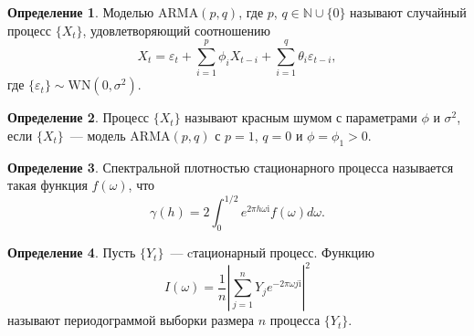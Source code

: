 \documentclass[specialist,
substylefile = spbu_report.rtx,
subf,href,colorlinks=true, 12pt]{disser}
\theoremstyle{definition}
\newtheorem{definition}{Определение}[section]
\newcommand{\im}{\mathrm{i}}
\begin{document}
\begin{definition}
	Моделью $\mathrm{ARMA}(p, q)$, где $p$, $q\in \mathbb{N}\cup\{0\}$ называют случайный процесс $\{X_t\}$, удовлетворяющий соотношению
	\[
		X_t=\varepsilon_t + \sum_{i=1}^p \phi_i X_{t-i} + \sum_{i=1}^q\theta_i\varepsilon_{t-i},
	\]
	где $\{\varepsilon_t\}\sim\mathrm{WN}(0, \sigma^2)$.
\end{definition}

\begin{definition}
	Процесс $\{X_t\}$ называют красным шумом с параметрами $\phi$ и $\sigma^2$, если $\{X_t\}$~--- модель $\mathrm{ARMA}(p, q)$ с $p=1$, $q=0$ и $\phi=\phi_1>0$.
\end{definition}

\begin{definition}
	Спектральной плотностью стационарного процесса называется такая функция $f(\omega)$, что
	\[
		\gamma(h)=2\int_{0}^{1/2} e^{2\pi h\omega\im}f(\omega)d\omega.
	\]
\end{definition}
\begin{definition}
	Пусть $\{Y_t\}$~--- cтационарный процесс. Функцию
	\[
		I(\omega)=\frac1n\left|\sum_{j=1}^{n} Y_je^{-2\pi \omega j\mathrm{i}}\right|^2
	\]
	называют периодограммой выборки размера $n$ процесса $\{Y_t\}$.
\end{definition}
\end{document}
